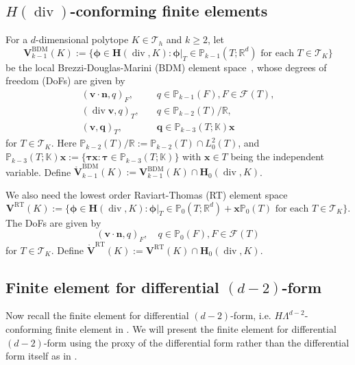 \documentclass[10pt]{amsart}
\renewcommand{\div}{\operatorname{div}}
\numberwithin{equation}{section}
\begin{document}
\subsection{$H(\div)$-conforming finite elements}
For a $d$-dimensional polytope $K\in \mathcal T_h$ and $k\geq2$, let 
\[
\boldsymbol{V}_{k-1}^{\mathrm{BDM}}(K):=\{\boldsymbol{\phi}\in\boldsymbol{H}(\div, K): \boldsymbol{\phi}|_{T}\in \mathbb P_{k-1}(T;\mathbb R^d) \textrm{ for each } T\in\mathcal T_K\}
\]
be the local Brezzi-Douglas-Marini (BDM) element space~\cite{BrezziDouglasMarini1986,BrezziDouglasDuranFortin1987,Nedelec:1986family}, whose degrees of freedom (DoFs) are given by \cite{ChenHuang2021divdiv}
\begin{align}
(\boldsymbol{v}\cdot\boldsymbol{n}, q)_F, & \quad q\in \mathbb P_{k-1}(F), F\in\mathcal F(T), \label{BDMdof1} \\
(\div\boldsymbol{v}, q)_T, & \quad q\in \mathbb P_{k-2}(T)/\mathbb R, \label{BDMdof2} \\
(\boldsymbol{v}, \boldsymbol{q})_T, & \quad \boldsymbol{q}\in \mathbb P_{k-3}(T;\mathbb K)\boldsymbol{x} \label{BDMdof3}
\end{align}
for $T\in\mathcal T_K$. Here $\mathbb P_{k-2}(T)/\mathbb R:=\mathbb P_{k-2}(T)\cap L_0^2(T)$, and $\mathbb P_{k-3}(T;\mathbb K)\boldsymbol{x}:=\{\boldsymbol{\tau}\boldsymbol{x}: \boldsymbol{\tau}\in \mathbb P_{k-3}(T;\mathbb K)\}$ with $\boldsymbol{x}\in T$ being the independent variable.
Define $\mathring{\boldsymbol{V}}_{k-1}^{\mathrm{BDM}}(K):=\boldsymbol{V}_{k-1}^{\mathrm{BDM}}(K)\cap \boldsymbol{H}_0(\div, K)$.

We also need the lowest order Raviart-Thomas (RT) element space~\cite{RaviartThomas1977,Nedelec1980}
\[
\boldsymbol{V}^{\mathrm{RT}}(K):=\{\boldsymbol{\phi}\in\boldsymbol{H}(\div, K): \boldsymbol{\phi}|_{T}\in \mathbb P_{0}(T;\mathbb R^d)+\boldsymbol{x}\mathbb P_{0}(T) \textrm{ for each } T\in\mathcal T_K\}.
\]
The DoFs are given by
\[
(\boldsymbol{v}\cdot\boldsymbol{n}, q)_F,  \quad q\in \mathbb P_{0}(F), F\in\mathcal F(T)
\]
for $T\in\mathcal T_K$.
Define $\mathring{\boldsymbol{V}}^{\mathrm{RT}}(K):=\boldsymbol{V}^{\mathrm{RT}}(K)\cap \boldsymbol{H}_0(\div, K)$.




\subsection{Finite element for differential $(d-2)$-form}
Now recall the finite element for differential $(d-2)$-form, i.e. $H\Lambda^{d-2}$-conforming finite element in \cite{ArnoldFalkWinther2006,Arnold2018}. We will present the finite element for differential $(d-2)$-form using the proxy of the differential form rather than the differential form itself as in \cite{ArnoldFalkWinther2006,Arnold2018}. 
\end{document}
